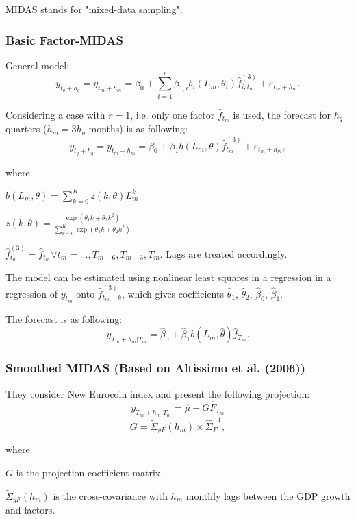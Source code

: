 \documentclass[8pt, a4paper, twocolumn, landscape]{extarticle}
\begin{document}
	 MIDAS stands for "mixed-data sampling".
	 
	 \subsubsection{Basic Factor-MIDAS}
	 
	 General model:
	 \[
	 y_{t_q + h_q} = y_{t_m + h_m} = \beta_0 + \sum_{i = 1}^{r} \beta_{1, i} b_i (L_m, \theta_i) \hat{f}_{i, t_m}^{(3)} + \varepsilon_{t_m + h_m}.
	 \]
	 
	 Considering a case with $r = 1$, i.e. only one factor $\hat{f}_{t_m}$ is used, the forecast for $h_q$ quarters ($h_m = 3h_q$ months) is as following:
	 \[
	 y_{t_q + h_q} = y_{t_m + h_m} = \beta_0 + \beta_{1} b (L_m, \theta) \hat{f}_{t_m}^{(3)} + \varepsilon_{t_m + h_m},
	 \]
	 
	 where
	 \smallskip
	 
	 $b(L_m, \theta) = \sum_{k=0}^{K} z(k, \theta) L_m^k$
	 \smallskip
	 
	 $z(k, \theta) = \frac{\exp{(\theta_1k + \theta_2k^2)}}{\sum_{k=0}^{K}\exp{(\theta_1k + \theta_2k^2)}}$
	 \smallskip
	 
	 $\hat{f}_{t_m}^{(3)} = \hat{f}_{t_m} \forall t_m = \dots, T_{m-6}, T_{m-3}, T_m$. Lags are treated accordingly.
	 \medskip
	 
	 The model can be estimated using nonlinear least squares in a regression in a regression of $y_{t_m}$ onto $\hat{f}_{t_m - k}^{(3)}$, which gives coefficients $\hat{\theta}_1$, $\hat{\theta}_2$, $\hat{\beta}_0$, $\hat{\beta}_1$.
	 \medskip
	 
	 The forecast is as following:
	 \[
	 y_{T_m + h_m | T_m} = \hat{\beta}_0 + \hat{\beta}_1 b (L_m, \hat{\theta}) \hat{f}_{T_m}.
	 \]
	
	\subsubsection{Smoothed MIDAS (Based on Altissimo et al. (2006))}
	
	They consider New Eurocoin index and present the following projection:
	\[
	y_{T_m + h_m | T_m} = \hat{\mu} + G\hat{F}_{T_m}
	\]
	\[
	G = \tilde{\Sigma}_{yF}(h_m) \times \hat{\Sigma}_F^{-1},
	\]
	
	where
	\smallskip
	
	$G$ is the projection coefficient matrix.
	\smallskip
	
	$\tilde{\Sigma}_{yF}(h_m)$ is the cross-covariance with $h_m$ monthly lags between the GDP growth and factors. 
	\smallskip
	
\end{document}

